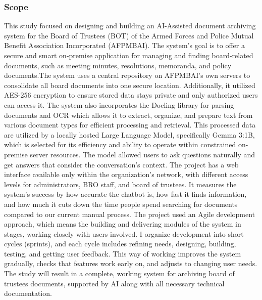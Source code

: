         \subsubsection{Scope}
           This study focused on designing and building an AI-Assisted document archiving system for the Board of Trustees (BOT) of the Armed Forces and Police Mutual Benefit Association Incorporated (AFPMBAI). The system's goal is to offer a secure and smart on-premise application for managing and finding board-related documents, such as meeting minutes, resolutions, memoranda, and policy documents.The system uses a central repository on AFPMBAI's own servers to consolidate all board documents into one secure location. Additionally, it utilized AES-256 encryption to ensure stored data stays private and only authorized users can access it. The system also incorporates the Docling library for parsing documents and OCR which allows it to extract, organize, and prepare text from various document types for efficient processing and retrieval. This processed data are utilized by a locally hosted Large Language Model, specifically Gemma 3:1B, which is selected for its efficiency and ability to operate within constrained on-premise server resources. The model allowed users to ask questions naturally and get answers that consider the conversation's context. The project has a web interface available only within the organization's network, with different access levels for administrators, BRO staff, and board of trustees. It measures the system's success by how accurate the chatbot is, how fast it finds information, and how much it cuts down the time people spend searching for documents compared to our current manual process. The project used an Agile development approach, which means the building and delivering modules of the system in stages, working closely with users involved. I organize development into short cycles (sprints), and each cycle includes refining needs, designing, building, testing, and getting user feedback. This way of working improves the system gradually, checks that features work early on, and adjusts to changing user needs. The study will result in a complete, working system for archiving board of trustees documents, supported by AI along with all necessary technical documentation.
           
